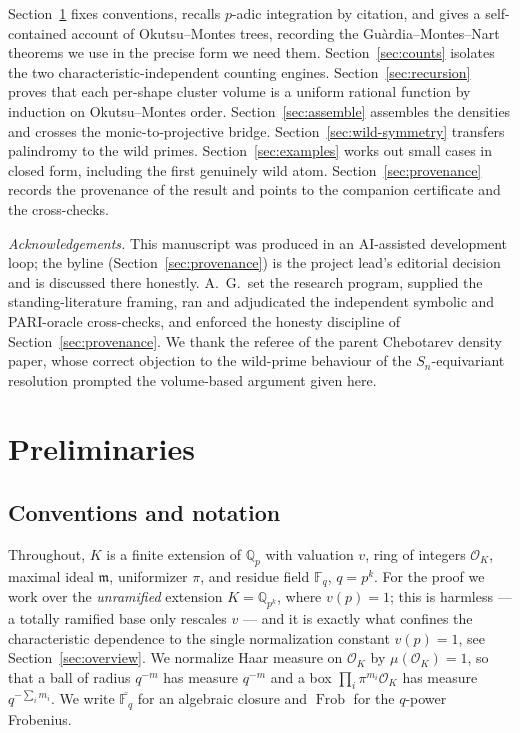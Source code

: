 \documentclass[pdflatex,sn-mathphys-num]{sn-jnl}%
\DeclareMathOperator{\Frob}{Frob}
\newcommand{\Qp}{\mathbb{Q}_p}
\newcommand{\OK}{\mathcal{O}_K}
\newcommand{\bbF}{\mathbb{F}}
\newcommand{\bbQ}{\mathbb{Q}}
\newcommand{\fkm}{\mathfrak{m}}
\theoremstyle{plain}
\theoremstyle{definition}
\theoremstyle{remark}
\numberwithin{equation}{section}
\begin{document}
Section~\ref{sec:prelim} fixes conventions, recalls $p$-adic integration by
citation, and gives a self-contained account of Okutsu--Montes trees, recording the
Gu\`ardia--Montes--Nart theorems we use in the precise form we need them.
Section~\ref{sec:counts}
isolates the two characteristic-independent counting engines. Section~\ref{sec:recursion}
proves that each per-shape cluster volume is a uniform rational function by
induction on Okutsu--Montes order. Section~\ref{sec:assemble} assembles the
densities and crosses the monic-to-projective bridge. Section~\ref{sec:wild-symmetry}
transfers palindromy to the wild primes. Section~\ref{sec:examples} works out
small cases in closed form, including the first genuinely wild atom.
Section~\ref{sec:provenance} records the provenance of the result and points to
the companion certificate and the cross-checks.

\medskip
\noindent\textit{Acknowledgements.} This manuscript was produced in an
AI-assisted development loop; the byline (Section~\ref{sec:provenance}) is the
project lead's editorial decision and is discussed there honestly. A.~G.\ set the
research program, supplied the standing-literature framing, ran and adjudicated
the independent symbolic and PARI-oracle cross-checks, and enforced the honesty
discipline of Section~\ref{sec:provenance}. We thank the referee of the parent
Chebotarev density paper, whose correct objection to the wild-prime behaviour of
the $S_{n}$-equivariant resolution prompted the volume-based argument given here.

\section{Preliminaries}\label{sec:prelim}

\subsection{Conventions and notation}\label{sec:conventions}

Throughout, $K$ is a finite extension of $\Qp$ with valuation $v$, ring of
integers $\OK$, maximal ideal $\fkm$, uniformizer $\pi$, and residue field
$\bbF_{q}$, $q=p^{k}$. For the proof we work over the \emph{unramified} extension
$K=\bbQ_{p^{k}}$, where $v(p)=1$; this is harmless --- a totally ramified base
only rescales $v$ --- and it is exactly what confines the characteristic
dependence to the single normalization constant $v(p)=1$, see
Section~\ref{sec:overview}. We normalize Haar measure on $\OK$ by $\mu(\OK)=1$,
so that a ball of radius $q^{-m}$ has measure $q^{-m}$ and a box
$\prod_{i}\pi^{m_{i}}\OK$ has measure $q^{-\sum_{i}m_{i}}$. We write
$\overline{\bbF_{q}}$ for an algebraic closure and $\Frob$ for the $q$-power
Frobenius.
\end{document}

